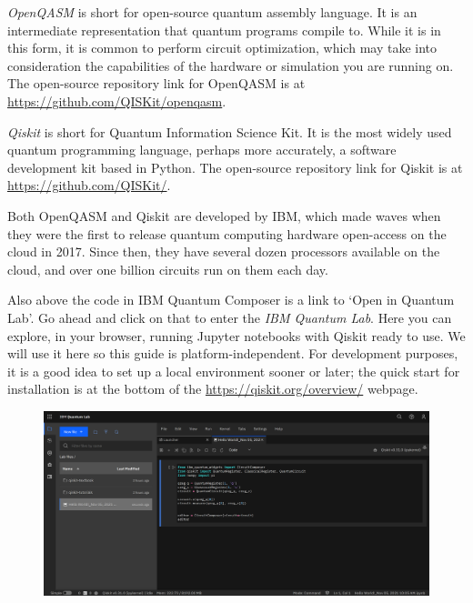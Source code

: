 \documentclass{article}
\theoremstyle{definition}
\begin{document}
\textit{OpenQASM} is short for open-source quantum assembly language.  It is an intermediate representation that quantum programs compile to.  While it is in this form, it is common to perform circuit optimization, which may take into consideration the capabilities of the hardware or simulation you are running on.  The open-source repository link for OpenQASM is at \url{https://github.com/QISKit/openqasm}.

\textit{Qiskit} is short for Quantum Information Science Kit.  It is the most widely used quantum programming language, perhaps more accurately, a software development kit based in Python.  The open-source repository link for Qiskit is at \url{https://github.com/QISKit/}.

Both OpenQASM and Qiskit are developed by IBM, which made waves when they were the first to release quantum computing hardware open-access on the cloud in 2017.  Since then, they have several dozen processors available on the cloud, and over one billion circuits run on them each day.

Also above the code in IBM Quantum Composer is a link to `Open in Quantum Lab'.  Go ahead and click on that to enter the \textit{IBM Quantum Lab}.  Here you can explore, in your browser, running Jupyter notebooks with Qiskit ready to use.  We will use it here so this guide is platform-independent.  For development purposes, it is a good idea to set up a local environment sooner or later; the quick start for installation is at the bottom of the \url{https://qiskit.org/overview/} webpage.
\begin{figure}[H]
	\includegraphics[width=\columnwidth]{images/HelloWorld_IBMQuantumLab.PNG}
\end{figure}
\end{document}
